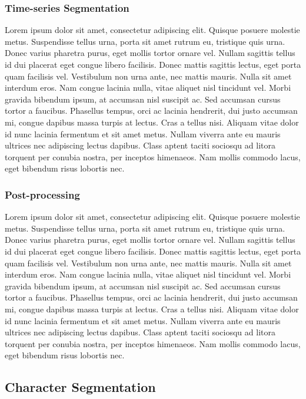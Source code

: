 \documentclass[12pt]{article}
\begin{document}
		\subsubsection{Time-series Segmentation}
		Lorem ipsum dolor sit amet, consectetur adipiscing elit. Quisque posuere molestie metus. Suspendisse tellus urna, porta sit amet rutrum eu, tristique quis urna. Donec varius pharetra purus, eget mollis tortor ornare vel. Nullam sagittis tellus id dui placerat eget congue libero facilisis. Donec mattis sagittis lectus, eget porta quam facilisis vel. Vestibulum non urna ante, nec mattis mauris. Nulla sit amet interdum eros. Nam congue lacinia nulla, vitae aliquet nisl tincidunt vel. Morbi gravida bibendum ipsum, at accumsan nisl suscipit ac. Sed accumsan cursus tortor a faucibus. Phasellus tempus, orci ac lacinia hendrerit, dui justo accumsan mi, congue dapibus massa turpis at lectus. Cras a tellus nisi. Aliquam vitae dolor id nunc lacinia fermentum et sit amet metus. Nullam viverra ante eu mauris ultrices nec adipiscing lectus dapibus. Class aptent taciti sociosqu ad litora torquent per conubia nostra, per inceptos himenaeos. Nam mollis commodo lacus, eget bibendum risus lobortis nec.
		\subsubsection{Post-processing}
		Lorem ipsum dolor sit amet, consectetur adipiscing elit. Quisque posuere molestie metus. Suspendisse tellus urna, porta sit amet rutrum eu, tristique quis urna. Donec varius pharetra purus, eget mollis tortor ornare vel. Nullam sagittis tellus id dui placerat eget congue libero facilisis. Donec mattis sagittis lectus, eget porta quam facilisis vel. Vestibulum non urna ante, nec mattis mauris. Nulla sit amet interdum eros. Nam congue lacinia nulla, vitae aliquet nisl tincidunt vel. Morbi gravida bibendum ipsum, at accumsan nisl suscipit ac. Sed accumsan cursus tortor a faucibus. Phasellus tempus, orci ac lacinia hendrerit, dui justo accumsan mi, congue dapibus massa turpis at lectus. Cras a tellus nisi. Aliquam vitae dolor id nunc lacinia fermentum et sit amet metus. Nullam viverra ante eu mauris ultrices nec adipiscing lectus dapibus. Class aptent taciti sociosqu ad litora torquent per conubia nostra, per inceptos himenaeos. Nam mollis commodo lacus, eget bibendum risus lobortis nec.

	\subsection{Character Segmentation}
\end{document}
